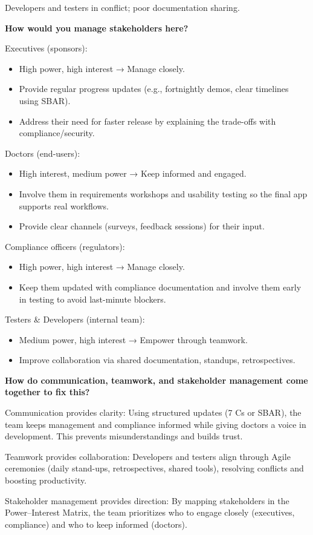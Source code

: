 Developers and testers in conflict; poor documentation sharing.


\bigskip

\noindent\textbf{How would you manage stakeholders here?}


Executives (sponsors):
\begin{itemize}
    \item High power, high interest → Manage closely.
    \item Provide regular progress updates (e.g., fortnightly demos, clear timelines using SBAR).
    \item Address their need for faster release by explaining the trade-offs with compliance/security.
\end{itemize}

\bigskip 

Doctors (end-users):
\begin{itemize}
    \item High interest, medium power → Keep informed and engaged.
    \item Involve them in requirements workshops and usability testing so the final app supports real workflows.
    \item Provide clear channels (surveys, feedback sessions) for their input.
\end{itemize}

Compliance officers (regulators):
\begin{itemize}
    \item High power, high interest → Manage closely.
    \item Keep them updated with compliance documentation and involve them early in testing to avoid last-minute blockers.
\end{itemize}

Testers \& Developers (internal team):
\begin{itemize}
    \item Medium power, high interest → Empower through teamwork.
    \item Improve collaboration via shared documentation, standups, retrospectives.
\end{itemize}

\bigskip

\noindent\textbf{How do communication, teamwork, and stakeholder management come together to fix this?}

Communication provides clarity: Using structured updates (7 Cs or SBAR), the team keeps management and compliance informed while giving doctors a voice in development. This prevents misunderstandings and builds trust.

Teamwork provides collaboration: Developers and testers align through Agile ceremonies (daily stand-ups, retrospectives, shared tools), resolving conflicts and boosting productivity.

Stakeholder management provides direction: By mapping stakeholders in the Power–Interest Matrix, the team prioritizes who to engage closely (executives, compliance) and who to keep informed (doctors).



